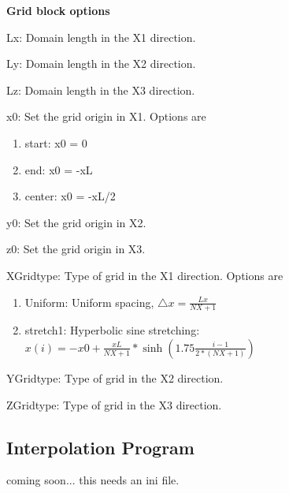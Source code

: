 \textbf{Grid block options}
\begin{description}
  \item Lx: Domain length in the X1 direction.
  \item Ly: Domain length in the X2 direction.
  \item Lz: Domain length in the X3 direction.
  \item x0: Set the grid origin in X1. Options are
  \begin{enumerate}
    \item start: x0 = 0
    \item end: x0 = -xL
    \item center: x0 = -xL/2
  \end{enumerate}
  \item y0: Set the grid origin in X2.
  \item z0: Set the grid origin in X3.
  \item XGridtype: Type of grid in the X1 direction. Options are
  \begin{enumerate}
    \item Uniform: Uniform spacing, $\triangle x = \frac{Lx}{NX+1}$
    \item stretch1: Hyperbolic sine stretching: $x(i) = -x0 + \frac{xL}{NX+1}*
                   \sinh \left( 1.75 \frac{i-1}{2*(NX+1)} \right)$
  \end{enumerate}
  \item YGridtype: Type of grid in the X2 direction.
  \item ZGridtype: Type of grid in the X3 direction.
\end{description}

\subsection{Interpolation Program}
coming soon... this needs an ini file.
